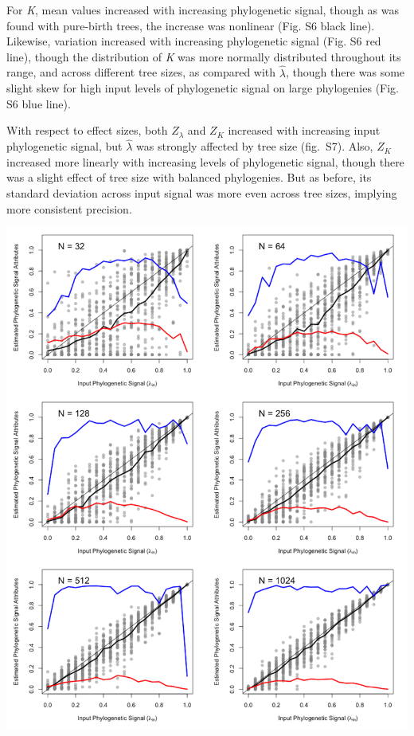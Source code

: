 \documentclass[
]{article}
\begin{document}
For \emph{K}, mean values increased with increasing phylogenetic signal,
though as was found with pure-birth trees, the increase was nonlinear
(Fig. S6 black line). Likewise, variation increased with increasing
phylogenetic signal (Fig. S6 red line), though the distribution of
\emph{K} was more normally distributed throughout its range, and across
different tree sizes, as compared with \(\hat{\lambda}\), though there
was some slight skew for high input levels of phylogenetic signal on
large phylogenies (Fig. S6 blue line). \hfill\break

With respect to effect sizes, both \(Z_{\lambda}\) and \(Z_K\) increased
with increasing input phylogenetic signal, but \(\hat{\lambda}\) was
strongly affected by tree size (fig.~S7). Also, \(Z_K\) increased more
linearly with increasing levels of phylogenetic signal, though there was
a slight effect of tree size with balanced phylogenies. But as before,
its standard deviation across input signal was more even across tree
sizes, implying more consistent precision.

\includegraphics[width=0.95\linewidth]{fig.S5}
\end{document}

